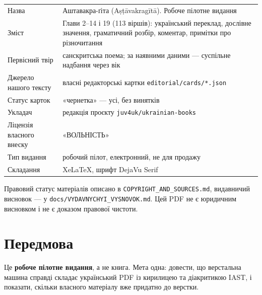 \documentclass[10pt,a5paper,openany]{book}
\begin{document}
\vspace{0.8em}
\noindent
\begin{tabular}{@{}p{}p{}@{}}
\textsf{Назва} & Аштавакра-ґіта (Aṣṭāvakragītā). Робоче пілотне видання \\[0.3em]
\textsf{Зміст} & Глави 2–14 і 19 (113 віршів): український переклад, дослівне значення,
граматичний розбір, коментар, примітки про різночитання \\[0.3em]
\textsf{Первісний твір} & санскритська поема; за наявними даними —
суспільне надбання через вік \\[0.3em]
\textsf{Джерело нашого тексту} & власні редакторські картки
\texttt{editorial/}\allowbreak\texttt{cards/*.json} \\[0.3em]
\textsf{Статус карток} & «чернетка» — усі, без винятків \\[0.3em]
\textsf{Укладач} & редакція проєкту \texttt{juv4uk/ukrainian-books} \\[0.3em]
\textsf{Ліцензія власного внеску} & «ВОЛЬНІСТЬ» \\[0.3em]
\textsf{Тип видання} & робочий пілот, електронний, не для продажу \\[0.3em]
\textsf{Складання} & XeLaTeX, шрифт DejaVu Serif \\[0.3em]
\end{tabular}

\vspace{1.2em}
\noindent\footnotesize
Правовий статус матеріалів описано в \texttt{COPYRIGHT\_}\allowbreak\texttt{AND\_}\allowbreak\texttt{SOURCES.md},
видавничий висновок — у \texttt{docs/}\allowbreak\texttt{VYDAVNYCHYI\_}\allowbreak\texttt{VYSNOVOK.md}. Цей PDF не є
юридичним висновком і не є доказом правової чистоти.
\endgroup
\vspace*{\fill}

\frontmatter
\pagestyle{headings}
\tableofcontents
\clearpage
\chapter*{Передмова}

Це \textbf{робоче пілотне видання}, а не книга. Мета одна: довести, що
верстальна машина справді складає український PDF із кирилицею та діакритикою
IAST, і показати, скільки власного матеріалу вже придатно до верстки.
\end{document}
